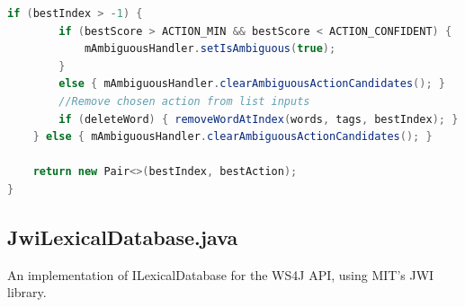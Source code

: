\documentclass[12pt]{article}
\begin{document}
\begin{lstlisting}[language=Java, caption=MainActivity.getBestAction()]
    if (bestIndex > -1) {
        if (bestScore > ACTION_MIN && bestScore < ACTION_CONFIDENT) {
            mAmbiguousHandler.setIsAmbiguous(true);
        }
        else { mAmbiguousHandler.clearAmbiguousActionCandidates(); }
        //Remove chosen action from list inputs
        if (deleteWord) { removeWordAtIndex(words, tags, bestIndex); }
    } else { mAmbiguousHandler.clearAmbiguousActionCandidates(); }

    return new Pair<>(bestIndex, bestAction);
}
\end{lstlisting}

\newpage
\subsection{JwiLexicalDatabase.java}
\label{appendix:customLexDB}

An implementation of ILexicalDatabase for the WS4J API, using MIT's JWI library.
\end{document}
